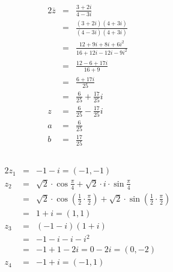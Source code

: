 \documentclass[10pt,a4paper,oneside,ngerman,numbers=noenddot]{scrartcl}
\begin{document}
\subsection{} %
\begin{alignat*}{2}
\overline{z} &=& \frac{3 + 2i}{4 - 3i} \\
&=& \frac{(3 + 2i)(4+3i)}{(4 - 3i)(4+3i)} \\
&=& \frac{12 + 9i + 8i + 6i^{2}}{16 + 12i - 12i - 9i^{2}} \\
&=& \frac{12 - 6 + 17i}{16 + 9} \\
&=& \frac{6 + 17i}{25} \\
&=& \frac{6}{25} + \frac{17}{25}i \\
z &=& \frac{6}{25} - \frac{17}{25}i \\
a &=& \frac{6}{25} \\
b &=& \frac{17}{25}
\end{alignat*}
\subsection{} %
\begin{alignat*}{2}
z_{1} &=& -1 - i = (-1, -1) \\
z_{2} &=& \sqrt{2} \cdot \cos \frac{\pi}{4} + \sqrt{2} \cdot i \cdot \sin \frac{\pi}{4} \\
&=& \sqrt{2} \cdot \cos \left(\frac{1}{2} \cdot \frac{\pi}{2} \right) + \sqrt{2} \cdot \sin \left(\frac{1}{2} \cdot \frac{\pi}{2} \right) \\
&=& 1 + i = (1, 1) \\
z_{3} &=& (-1 -i)(1+ i) \\
&=& -1 - i - i - i^{2} \\
&=&  -1 + 1 - 2i = 0 - 2i = (0, -2) \\
z_{4} &=& -1 + i = (-1, 1)
\end{alignat*}
\subsection{} %
\end{document}
